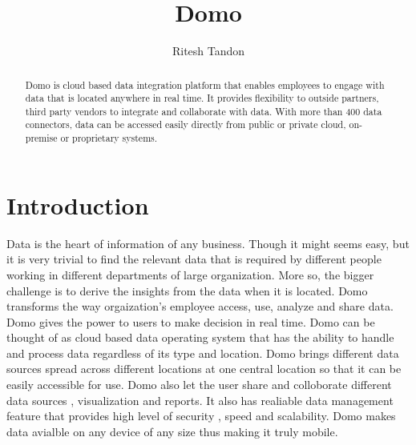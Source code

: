 
\title{Domo}

\author{Ritesh Tandon}


\renewcommand{\shortauthors}{R. Tandon}


\begin{abstract}

Domo is cloud based data integration platform that enables employees 
to engage with data that is located anywhere in real time. 
It provides flexibility to outside partners, third party vendors to 
integrate and collaborate with data. With more than 400 data connectors, 
data can be accessed easily directly from public or private cloud, 
on-premise or proprietary systems.

\end{abstract}


\maketitle


\section{Introduction}

Data is the heart of information of any business. 
Though it might seems easy, but it is very trivial 
to find the relevant data that is required by different 
people working in different departments of large organization. 
More so, the bigger challenge is to derive the insights 
from the data when it is located.
Domo transforms the way orgaization's employee access, use, 
analyze and share data. Domo gives the power to users to 
make decision in real time. Domo can be thought of as cloud 
based data operating system that has the ability to handle 
and process data regardless of its type and location. 
Domo brings different data sources spread across different 
locations at one central location so that it can be easily 
accessible for use. Domo also let the user share and 
colloborate different data sources , visualization and 
reports. It also has realiable data management feature 
that provides high level of security , speed and scalability. 
Domo makes data avialble on any device of any size thus 
making it truly mobile.

